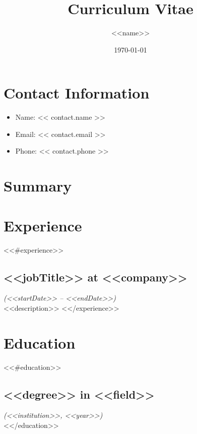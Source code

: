 \documentclass{article}
\title{Curriculum Vitae}
\author{<<name>>}
\date{\today}
\begin{document}
\maketitle

\section*{Contact Information}
\begin{itemize}
    \item Name: << contact.name >>  %
    \item Email: << contact.email >>  %
    \item Phone: << contact.phone >>   %
\end{itemize}

\section*{Summary}


\section*{Experience}
<<#experience>>
\subsection*{<<jobTitle>> at <<company>>}
\textit{(<<startDate>> -- <<endDate>>)}\\
<<description>>
<</experience>>

\section*{Education}
<<#education>>
\subsection*{<<degree>> in <<field>>}
\textit{(<<institution>>, <<year>>)}\\
<</education>>
\end{document}
